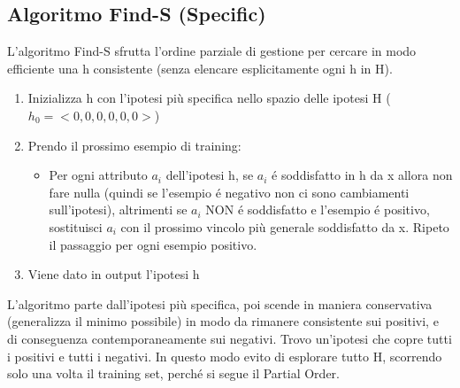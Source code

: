 \documentclass{article}
\begin{document}
\subsection{Algoritmo Find-S (Specific)}
L'algoritmo Find-S sfrutta l'ordine parziale di gestione per cercare in modo efficiente una h consistente (senza elencare esplicitamente ogni h in H).
\begin{enumerate}
    \item Inizializza h con l'ipotesi più specifica nello spazio delle ipotesi H ($h_0 = <0, 0, 0, 0, 0, 0>$)
    \item Prendo il prossimo esempio di training:
        \begin{itemize}
            \item Per ogni attributo $a_i$ dell'ipotesi h, se $a_i$ é soddisfatto in h da x allora non fare nulla (quindi se l'esempio é negativo non ci sono cambiamenti sull'ipotesi), altrimenti se $a_i$ NON é soddisfatto e l'esempio é positivo, sostituisci $a_i$ con il prossimo vincolo più generale soddisfatto da x. \newline 
            Ripeto il passaggio per ogni esempio positivo.
        \end{itemize}
    \item Viene dato in output l'ipotesi h
\end{enumerate}
L'algoritmo parte dall'ipotesi più specifica, poi scende in maniera conservativa (generalizza il minimo possibile) in modo da rimanere consistente sui positivi, e di conseguenza contemporaneamente sui negativi. Trovo un'ipotesi che copre tutti i positivi e tutti i negativi. In questo modo evito di esplorare tutto H, scorrendo solo una volta il training set, perché si segue il Partial Order.
\end{document}
